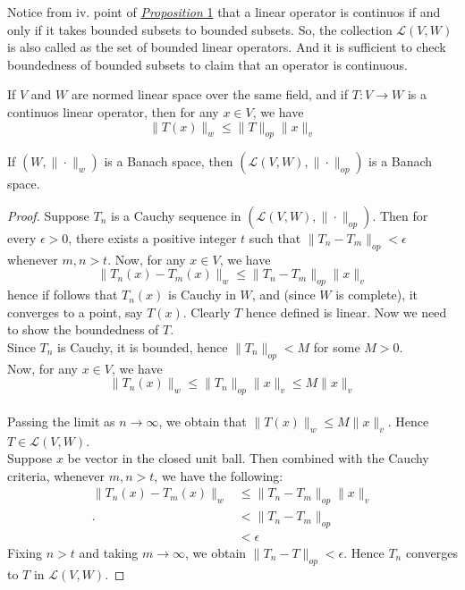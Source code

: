 \begin{note}
    Notice from iv. point of \hyperlink{prop1}{\textit{Proposition} 1} that a linear operator is continuos if and only if it takes bounded subsets to bounded subsets. So, the collection $\mathcal{L}(V,W)$ is also called as the set of bounded linear operators. And it is sufficient to check boundedness of bounded subsets to claim that an operator is continuous.
\end{note}
\vspace{0.4cm}
\begin{corollary}
    If $V$ and $W$ are normed linear space over the same field, and if $T:V\to W$ is a continuos linear operator, then for any $x\in V$, we have $$\|T(x)\|_{w}\leq\|T\|_{op}\|x\|_{v}$$
\end{corollary}
\vspace{0.4cm}
\begin{prop}
    If $(W,\|\cdot\|_{w})$ is a Banach space, then $(\mathcal{L}(V,W),\|\cdot\|_{op})$ is a Banach space.
\end{prop}
\begin{proof}
    Suppose $T_{n}$ is a Cauchy sequence in $(\mathcal{L}(V,W),\|\cdot\|_{op})$. Then for every $\epsilon>0$, there exists a positive integer $t$ such that $\|T_{n}-T_{m}\|_{op}<\epsilon$ whenever $m,n>t$. Now, for any $x\in V$, we have $$\|T_{n}(x)-T_{m}(x)\|_{w}\leq\|T_{n}-T_{m}\|_{op}\|x\|_{v}$$
    hence if follows that $T_{n}(x)$ is Cauchy in $W$, and (since $W$ is complete), it converges to a point, say $T(x)$. Clearly $T$ hence defined is linear. Now we need to show the boundedness of $T$.\\ 
    Since $T_{n}$ is Cauchy, it is bounded, hence $\|T_{n}\|_{op}<M$ for some $M>0$.\\
    Now, for any $x\in V$, we have $$\|T_{n}(x)\|_{w}\leq\|T_{n}\|_{op}\|x\|_{v}\leq M\|x\|_{v}$$\\
    Passing the limit as $n\to\infty$, we obtain that $\|T(x)\|_{w}\leq M\|x\|_{v}$. Hence $T\in \mathcal{L}(V,W)$.\\
    Suppose $x$ be vector in the closed unit ball. Then combined with the Cauchy criteria, whenever $m,n>t$, we have the following:
    $$\begin{aligned}
        \|T_{n}(x)-T_{m}(x)\|_{w}&\leq\|T_{n}-T_{m}\|_{op}\|x\|_{v}\\ 
      .                           &<\|T_{n}-T_{m}\|_{op}\\
                                 &<\epsilon
    \end{aligned}$$
    Fixing $n>t$ and taking $m\to\infty$, we obtain $\|T_{n}-T\|_{op}<\epsilon$. Hence $T_{n}$ converges to $T$ in $\mathcal{L}(V,W)$.
\end{proof}
